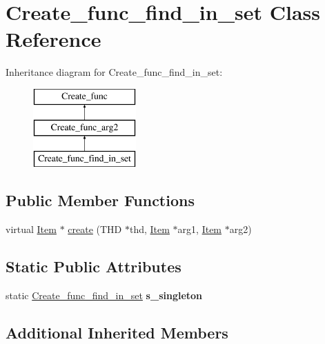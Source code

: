 \hypertarget{classCreate__func__find__in__set}{}\section{Create\+\_\+func\+\_\+find\+\_\+in\+\_\+set Class Reference}
\label{classCreate__func__find__in__set}
Inheritance diagram for Create\+\_\+func\+\_\+find\+\_\+in\+\_\+set\+:\begin{figure}[H]
\begin{center}
\leavevmode
\includegraphics[height=3.000000cm]{classCreate__func__find__in__set}
\end{center}
\end{figure}
\subsection*{Public Member Functions}
\begin{DoxyCompactItemize}
\item 
virtual \mbox{\hyperlink{classItem}{Item}} $\ast$ \mbox{\hyperlink{classCreate__func__find__in__set_a6510065949ea46bc8b493289fc63f861}{create}} (T\+HD $\ast$thd, \mbox{\hyperlink{classItem}{Item}} $\ast$arg1, \mbox{\hyperlink{classItem}{Item}} $\ast$arg2)
\end{DoxyCompactItemize}
\subsection*{Static Public Attributes}
\begin{DoxyCompactItemize}
\item 
\mbox{\label{classCreate__func__find__in__set_aeb5a1da42c79e9b2a623a471ec91240c}} 
static \mbox{\hyperlink{classCreate__func__find__in__set}{Create\+\_\+func\+\_\+find\+\_\+in\+\_\+set}} {\bfseries s\+\_\+singleton}
\end{DoxyCompactItemize}
\subsection*{Additional Inherited Members}


